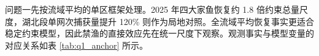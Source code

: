 问题一先按流域平均的单区框架处理。2025 年四大家鱼恢复约 1.8 倍约束总量尺度，湖北段单网次捕获量提升 120\% 则作为局地对照。全流域平均恢复事实更适合稳定约束模型，因此禁渔的直接效应先在统一尺度下观察。观测事实与模型变量的对应关系如表 \ref{tab:q1_anchor} 所示。
